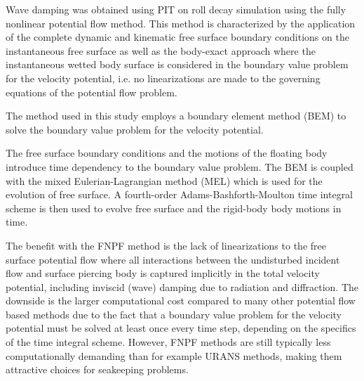 \label{fnpf-method} Wave damping was obtained using PIT on roll decay
simulation using the fully nonlinear potential flow method. This method
is characterized by the application of the complete dynamic and
kinematic free surface boundary conditions on the instantaneous free
surface as well as the body-exact approach where the instantaneous
wetted body surface is considered in the boundary value problem for the
velocity potential, i.e. no linearizations are made to the governing
equations of the potential flow problem.

The method used in this study employs a boundary element method (BEM)
\cite{7505983/FD4N3DW2} to solve the boundary value problem for the
velocity potential.

The free surface boundary conditions and the motions of the floating
body introduce time dependency to the boundary value problem. The BEM is
coupled with the mixed Eulerian-Lagrangian method (MEL)
\cite{7505983/ZKB494GT} which is used for the evolution of free surface.
A fourth-order Adams-Bashforth-Moulton time integral scheme is then used
to evolve free surface and the rigid-body body motions in time.

The benefit with the FNPF method is the lack of linearizations to the
free surface potential flow where all interactions between the
undisturbed incident flow and surface piercing body is captured
implicitly in the total velocity potential, including inviscid (wave)
damping due to radiation and diffraction. The downside is the larger
computational cost compared to many other potential flow based methods
due to the fact that a boundary value problem for the velocity potential
must be solved at least once every time step, depending on the specifics
of the time integral scheme. However, FNPF methods are still typically
less computationally demanding than for example URANS methods, making
them attractive choices for seakeeping problems.

    